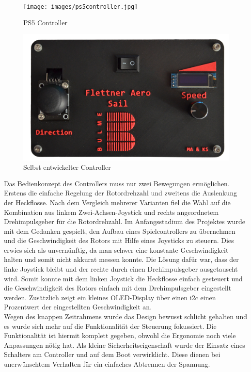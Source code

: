 \documentclass[a4paper,12pt]{article}
\begin{document}
\begin{figure}[H]
    \centering
    \begin{minipage}[b]{0.45\linewidth}
        \centering
        \texttt{[image: images/ps5controller.jpg]}
        \caption{PS5 Controller \cite{sony_dualsense}}
        \label{fig:PS5controller}
    \end{minipage}
    \hspace{1em}
    \begin{minipage}[b]{0.48\linewidth}
        \centering
        \includegraphics[width=\linewidth]{images/Controller ohne Hintergrund.jpg}
        \caption{Selbst entwickelter Controller}
        \label{fig:Controller}
    \end{minipage}
\end{figure}


Das Bedienkonzept des Controllers muss nur zwei Bewegungen ermöglichen. Erstens die einfache Regelung der Rotordrehzahl und zweitens die Auslenkung der Heckflosse. Nach dem Vergleich mehrerer Varianten fiel die Wahl auf die Kombination aus linkem Zwei-Achsen-Joystick und rechts angeordnetem Drehimpulsgeber für die Rotordrehzahl. Im Anfangsstadium des Projektes wurde mit dem Gedanken gespielt, den Aufbau eines Spielcontrollers zu übernehmen und die Geschwindigkeit des Rotors mit Hilfe eines Joysticks zu steuern. Dies erwies sich als unvernünftig, da man schwer eine konstante Geschwindigkeit halten und somit nicht akkurat messen konnte. Die Lösung dafür war, dass der linke Joystick bleibt und der rechte durch einen Drehimpulsgeber ausgetauscht wird. Somit konnte mit dem linken Joystick die Heckflosse einfach gesteuert und die Geschwindigkeit des Rotors einfach mit dem Drehimpulsgeber eingestellt werden. Zusätzlich zeigt ein kleines OLED-Display über einen \gls{i2c} einen Prozentwert der eingestellten Geschwindigkeit an.
\\[0.8em]
Wegen des knappen Zeitrahmens wurde das Design bewusst schlicht gehalten und es wurde sich mehr auf die Funktionalität der Steuerung fokussiert. Die Funktionalität ist hiermit komplett gegeben, obwohl die Ergonomie noch viele Anpassungen nötig hat. Als kleine Sicherheitseigenschaft wurde der Einsatz eines Schalters am Controller und auf dem Boot verwirklicht. Diese dienen bei unerwünschtem Verhalten für ein einfaches Abtrennen der Spannung.
\end{document}
